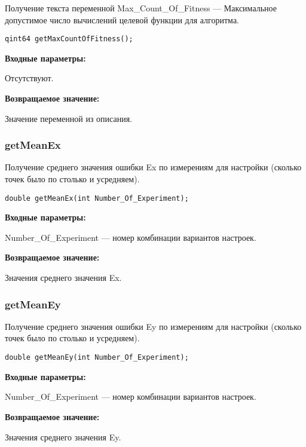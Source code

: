 \documentclass[a4paper,12pt]{article}
\begin{document}
Получение текста переменной  Max\_Count\_Of\_Fitness --- Максимальное допустимое число вычислений целевой функции для алгоритма.


\begin{lstlisting}[label=code_syntax_getMaxCountOfFitness,caption=Синтаксис]
qint64 getMaxCountOfFitness();
\end{lstlisting}

\textbf{Входные параметры:}

Отсутствуют.

\textbf{Возвращаемое значение:}

Значение переменной из описания.


\subsubsection{getMeanEx}\label{getMeanEx}

Получение среднего значения ошибки Ex по измерениям для настройки (сколько точек было по столько и усредняем).


\begin{lstlisting}[label=code_syntax_getMeanEx,caption=Синтаксис]
double getMeanEx(int Number_Of_Experiment);
\end{lstlisting}

\textbf{Входные параметры:}

Number\_Of\_Experiment --- номер комбинации вариантов настроек.

\textbf{Возвращаемое значение:}

Значения среднего значения Ex.


\subsubsection{getMeanEy}\label{getMeanEy}

Получение среднего значения ошибки Ey по измерениям для настройки (сколько точек было по столько и усредняем).


\begin{lstlisting}[label=code_syntax_getMeanEy,caption=Синтаксис]
double getMeanEy(int Number_Of_Experiment);
\end{lstlisting}

\textbf{Входные параметры:}

Number\_Of\_Experiment --- номер комбинации вариантов настроек.

\textbf{Возвращаемое значение:}

Значения среднего значения Ey.
\end{document}
